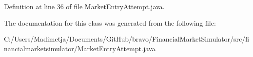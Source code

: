 Definition at line 36 of file Market\+Entry\+Attempt.\+java.



The documentation for this class was generated from the following file\+:\begin{DoxyCompactItemize}
\item 
C\+:/\+Users/\+Madimetja/\+Documents/\+Git\+Hub/bravo/\+Financial\+Market\+Simulator/src/financialmarketsimulator/Market\+Entry\+Attempt.\+java\end{DoxyCompactItemize}
